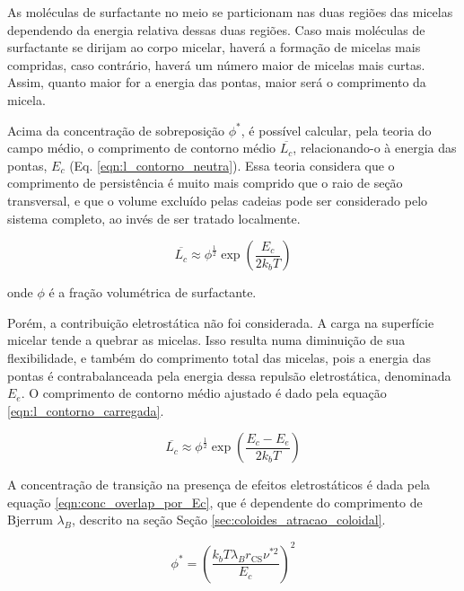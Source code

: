 		As moléculas de surfactante no meio se particionam nas duas regiões das micelas dependendo da energia relativa dessas duas regiões. Caso mais moléculas de surfactante se dirijam ao corpo micelar, haverá a formação de micelas mais compridas, caso contrário, haverá um número maior de micelas mais curtas. Assim, quanto maior for a energia das pontas, maior será o comprimento da micela.
		
		Acima da concentração de sobreposição \(\phi^*\), é possível calcular, pela teoria do campo médio, o comprimento de contorno médio \(\overline{L_c}\), relacionando-o à energia das pontas, \(E_c\) (Eq. \ref{eqn:l_contorno_neutra}). Essa teoria considera que o comprimento de persistência é muito mais comprido que o raio de seção transversal, e que o volume excluído pelas cadeias pode ser considerado pelo sistema completo, ao invés de ser tratado localmente. %
		
		\begin{equation}
			\overline{L_c} \approx \phi^{\frac{1}{2}} \exp \left(\dfrac{E_c}{2k_bT}\right)
			\label{eqn:l_contorno_neutra}
		\end{equation} %
		
		\noindent onde \(\phi\) é a fração volumétrica de surfactante. 
		
		Porém, a contribuição eletrostática não foi considerada. A carga na superfície micelar tende a quebrar as micelas. Isso resulta numa diminuição de sua flexibilidade, e também do comprimento total das micelas, pois a energia das pontas é contrabalanceada pela energia dessa repulsão eletrostática, denominada \(E_e\). O comprimento de contorno médio ajustado é dado pela equação \ref{eqn:l_contorno_carregada}.
		
		\begin{equation}
			\overline{L_c} \approx \phi^{\frac{1}{2}} \exp \left(\dfrac{E_c - E_e}{2k_bT}\right)
			\label{eqn:l_contorno_carregada}
		\end{equation} %

		A concentração de transição na presença de efeitos eletrostáticos é dada pela equação \ref{eqn:conc_overlap_por_Ec}, que é dependente do comprimento de Bjerrum \(\lambda_B\), descrito na seção Seção \ref{sec:coloides_atracao_coloidal}.
		
 		\begin{equation}
			\phi^* = \left( \frac{k_b T \lambda_B r_{\mathrm{CS}} \nu^{*2}}{E_c} \right) ^ 2
			\label{eqn:conc_overlap_por_Ec}
		\end{equation} %
	
